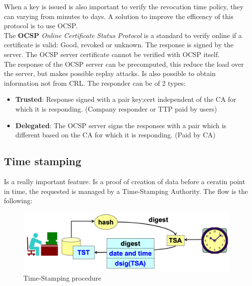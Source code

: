 \documentclass[12pt]{article}
\begin{document}
When a key is issued is also important to verify the revocation time policy, they can varying from minutes to days. A solution to improve the efficency of this protocol is to use OCSP.\\
The \textbf{OCSP} \textit{Online Certificate Status Protocol} is a standard to verify online if a certificate is valid: Good, revoked or unknown. The response is signed by the server. The OCSP server certificate cannot be verified with OCSP itself.\\
The response of the OCSP server can be precomputed, this reduce the load over the server, but makes possible replay attacks. Is also possible to obtain information not from CRL. The responder can be of 2 types:
\begin{itemize}
  \item \textbf{Trusted}: Response signed with a pair key;cert independent of the CA for which it is responding. (Company responder or TTP paid by users)
  \item \textbf{Delegated}: The OCSP server signs the responses with a pair which is different based on the CA for which it is responding. (Paid by CA)
\end{itemize}

\subsection{Time stamping}
Is a really important feature. Is a proof of creation of data before a ceratin point in time, the requested is managed by a Time-Stamping Authority. The flow is the following:
\begin{figure}[H]
   \centering
   \includegraphics[width=\linewidth]{images/tpf.png}
   \caption{Time-Stamping procedure}
   \label{fig:tpf}
\end{figure}
\end{document}
